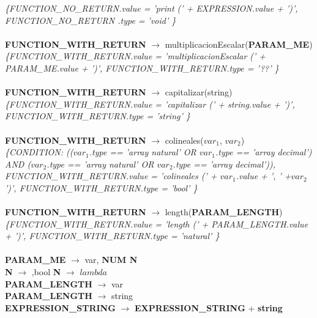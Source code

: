 \documentclass[10pt,a4paper]{article}
\begin{document}
\textit{\{FUNCTION\_NO\_RETURN.value =  'print (' + EXPRESSION.value + ')', FUNCTION\_NO\_RETURN .type = 'void' \}}  \\ \\


\textbf{FUNCTION\_WITH\_RETURN} $\rightarrow$ multiplicacionEscalar(\textbf{PARAM\_ME}) \\   

\textit{\{FUNCTION\_WITH\_RETURN.value =  'multiplicacionEscalar (' + PARAM\_ME.value + ')', FUNCTION\_WITH\_RETURN.type = '??' \}}  \\ \\


\textbf{FUNCTION\_WITH\_RETURN} $\rightarrow$ capitalizar(string)   \\

\textit{\{FUNCTION\_WITH\_RETURN.value =  'capitalizar (' + string.value + ')', FUNCTION\_WITH\_RETURN.type = 'string' \}}  \\ \\


\textbf{FUNCTION\_WITH\_RETURN} $\rightarrow$ colineales($var_{1}$, $var_{2}$)   \\

\textit{\{CONDITION: (($var_{1}$.type == 'array natural' OR $ var_{1}$.type == 'array decimal') AND
($var_{2}$.type == 'array natural' OR $var_{2}$.type == 'array decimal')), FUNCTION\_WITH\_RETURN.value =  'colineales (' + $var_{1}$.value + ', ' +$var_{2}$')', FUNCTION\_WITH\_RETURN.type = 'bool' \}}  \\ \\


\textbf{FUNCTION\_WITH\_RETURN} $\rightarrow$ length(\textbf{PARAM\_LENGTH}) \\

\textit{\{FUNCTION\_WITH\_RETURN.value =  'length (' + PARAM\_LENGTH.value + ')', FUNCTION\_WITH\_RETURN.type = 'natural' \}}  \\ \\


\textbf{PARAM\_ME} $\rightarrow$ var, \textbf{NUM N} \\
\textbf{N} $\rightarrow$ ,bool 
\textbf{N} $\rightarrow$ $lambda$  \\

\textbf{PARAM\_LENGTH} $\rightarrow$ var \\

\textbf{PARAM\_LENGTH} $\rightarrow$ string \\


\textbf{EXPRESSION\_STRING} $\rightarrow$ \textbf{EXPRESSION\_STRING} + \textbf{string} \\  
\end{document}
